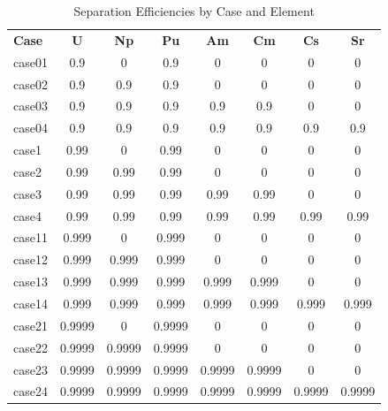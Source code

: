 \begin{table}[htbp]
\begin{center}
\caption{Separation Efficiencies by Case and Element}
\label{ses_table9}
\begin{tabular}{|l|c|c|c|c|c|c|c|}
\hline
\textbf{Case} & \textbf{U} & \textbf{Np} & \textbf{Pu} & \textbf{Am} & \textbf{Cm} & \textbf{Cs} & \textbf{Sr} \\
case01 & 0.9    & 0      & 0.9    & 0      & 0      & 0      & 0      \\
case02 & 0.9    & 0.9    & 0.9    & 0      & 0      & 0      & 0      \\
case03 & 0.9    & 0.9    & 0.9    & 0.9    & 0.9    & 0      & 0      \\
case04 & 0.9    & 0.9    & 0.9    & 0.9    & 0.9    & 0.9    & 0.9    \\
case1  & 0.99   & 0      & 0.99   & 0      & 0      & 0      & 0      \\
case2  & 0.99   & 0.99   & 0.99   & 0      & 0      & 0      & 0      \\
case3  & 0.99   & 0.99   & 0.99   & 0.99   & 0.99   & 0      & 0      \\
case4  & 0.99   & 0.99   & 0.99   & 0.99   & 0.99   &0.99    & 0.99   \\
case11 & 0.999  & 0      & 0.999  & 0      & 0      & 0      & 0      \\
case12 & 0.999  & 0.999  & 0.999  & 0      & 0      & 0      & 0      \\
case13 & 0.999  & 0.999  & 0.999  & 0.999  & 0.999  & 0      & 0      \\
case14 & 0.999  & 0.999  & 0.999  & 0.999  & 0.999  & 0.999  & 0.999  \\
case21 & 0.9999 & 0      & 0.9999 & 0      & 0      & 0      & 0      \\
case22 & 0.9999 & 0.9999 & 0.9999 & 0      & 0      & 0      & 0      \\
case23 & 0.9999 & 0.9999 & 0.9999 & 0.9999 & 0.9999 & 0      & 0      \\
case24 & 0.9999 & 0.9999 & 0.9999 & 0.9999 & 0.9999 & 0.9999 & 0.9999 \\
\hline
\end{tabular}
\end{center}
\end{table}



